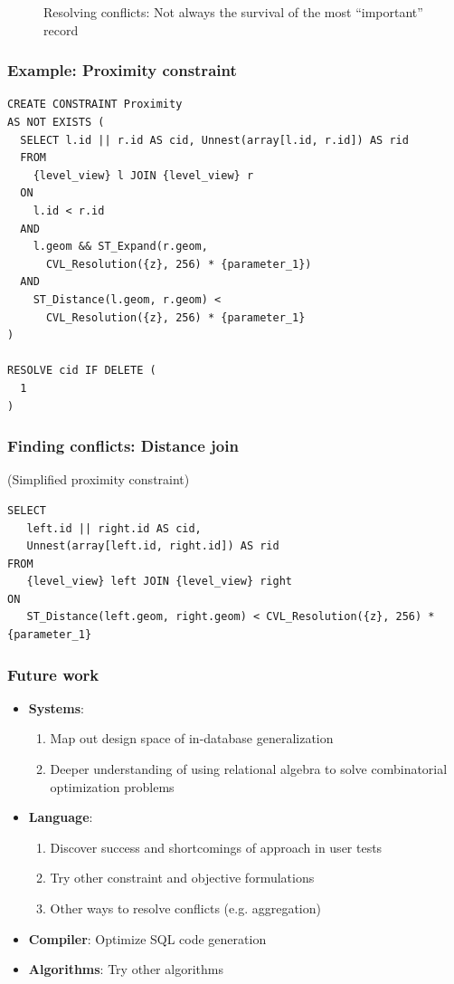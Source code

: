 \documentclass{beamer}
\begin{document}
{\begin{center}
\begin{figure}
  	\caption{Resolving conflicts: Not always the survival of the most ``important'' record}
  \end{figure}
  \end{center}
}


\begin{frame}[fragile]
\frametitle{Example: Proximity constraint}
\begin{lstlisting}
CREATE CONSTRAINT Proximity
AS NOT EXISTS (
  SELECT l.id || r.id AS cid, Unnest(array[l.id, r.id]) AS rid
  FROM
    {level_view} l JOIN {level_view} r
  ON
    l.id < r.id
  AND
    l.geom && ST_Expand(r.geom, 
      CVL_Resolution({z}, 256) * {parameter_1})
  AND
    ST_Distance(l.geom, r.geom) < 
      CVL_Resolution({z}, 256) * {parameter_1}
)

RESOLVE cid IF DELETE (
  1
)
\end{lstlisting}
\end{frame}

\begin{frame}[fragile]
\frametitle{Finding conflicts: Distance join}
(Simplified proximity constraint)
\begin{lstlisting}
SELECT
   left.id || right.id AS cid, 
   Unnest(array[left.id, right.id]) AS rid
FROM 
   {level_view} left JOIN {level_view} right
ON 
   ST_Distance(left.geom, right.geom) < CVL_Resolution({z}, 256) * {parameter_1}
\end{lstlisting}
\end{frame}


\frame
{
  \frametitle{Future work}
  \begin{itemize}
  \item \textbf{Systems}: 
  \begin{enumerate}
    \item Map out design space of in-database generalization
    \item Deeper understanding of using relational algebra to solve combinatorial optimization problems
  \end{enumerate}
  \item \textbf{Language}: 
  \begin{enumerate}
  	\item Discover success and shortcomings of approach in user tests
  	\item Try other constraint and objective formulations
  	\item Other ways to resolve conflicts (e.g. aggregation)
  \end{enumerate}
  \item \textbf{Compiler}: Optimize SQL code generation
  \item \textbf{Algorithms}: Try other algorithms
  \end{itemize}
  
  \begin{center}
  \end{center}

}
\end{document}
